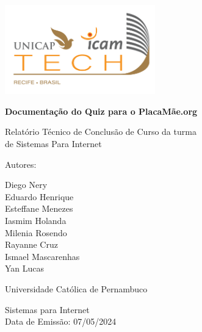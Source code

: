 \documentclass[12pt]{report}
\begin{document}
\newcommand{\titulo}{Documentação do Quiz para o PlacaMãe.org}
\newcommand{\nombreestudiante}{Diego Nery\\ Eduardo Henrique \\Esteffane Menezes\\ Iasmim Holanda \\Milenia Rosendo\\Rayanne Cruz \\ Ismael Mascarenhas\\ Yan Lucas \\}
\newcommand{\fecha}{\date{\today}}


\begin{titlepage}
	\centering
	\includegraphics[width=65mm]{FIGURAS/unicap.png}\par
	\vspace{1cm}
	{\LARGE\bfseries \titulo \par}
	\vfill
	{\large Relatório Técnico de Conclusão de Curso da turma\\de Sistemas Para Internet\par

	\vfill
	Autores:\par\vspace{2mm}
	\nombreestudiante\par
    \vfill
    Universidade Católica de Pernambuco\par
    Sistemas para Internet \\ Data de Emissão: 07/05/2024
 \par}
\end{titlepage}

\tableofcontents
\listoffigures







\printbibliography[heading=bibintoc, title={Referencias}]
\end{document}
